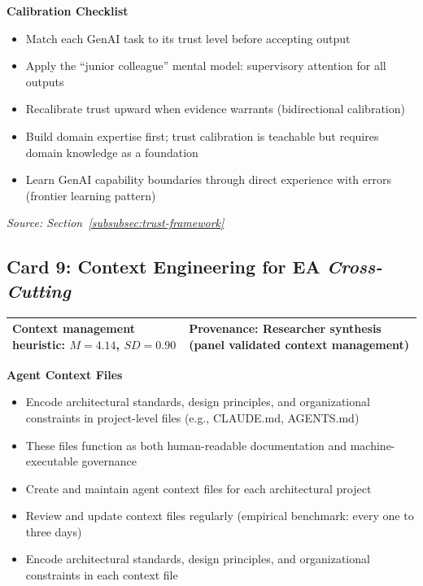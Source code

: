 \vspace{0.5em}
\textbf{Calibration Checklist}
\begin{itemize}[label=\checkbox]
    \item Match each GenAI task to its trust level before accepting output
    \item Apply the ``junior colleague'' mental model: supervisory attention for all outputs
    \item Recalibrate trust upward when evidence warrants (bidirectional calibration)
    \item Build domain expertise first; trust calibration is teachable but requires domain knowledge as a foundation
    \item Learn GenAI capability boundaries through direct experience with errors (frontier learning pattern)
\end{itemize}

\vspace{0.5em}
\textit{Source: Section~\ref{subsubsec:trust-framework}}

\clearpage
\subsection*{Card 9: Context Engineering for EA \hfill \textit{Cross-Cutting}}

\begin{tabular}{|p{7cm}|p{6cm}|}
    \hline
    \textbf{Context management heuristic:} $M = 4.14$, $SD = 0.90$ & \textbf{Provenance:} Researcher synthesis (panel validated context management) \\
    \hline
\end{tabular}

\vspace{0.5em}
\textbf{Agent Context Files}
\begin{itemize}
    \item Encode architectural standards, design principles, and organizational constraints in project-level files (e.g., CLAUDE.md, AGENTS.md)
    \item These files function as both human-readable documentation and machine-executable governance
\end{itemize}
\begin{itemize}[label=\checkbox]
    \item Create and maintain agent context files for each architectural project
    \item Review and update context files regularly (empirical benchmark: every one to three days)
    \item Encode architectural standards, design principles, and organizational constraints in each context file
\end{itemize}

